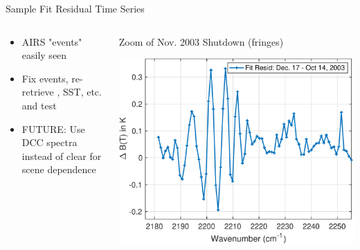 \documentclass[10pt,t]{beamer}
\begin{document}
\begin{frame}[label={sec:org71c5196}]{Sample Fit Residual Time Series}
\vspace{-0.2in}

\begin{columns}
\begin{column}{0.5\columnwidth}
\begin{block}{}
\begin{footnotesize}
\begin{itemize}
\item AIRS "events" easily seen
\item Fix events, re-retrieve \cd, SST, etc. and test
\item FUTURE: Use DCC spectra instead of clear for scene dependence
\end{itemize}
\end{footnotesize}
\end{block}
\end{column}

\begin{column}{0.5\columnwidth}
\begin{block}{\footnotesize Zoom of Nov. 2003 Shutdown (fringes)}
\vspace{-0.1in}
\begin{center}
\includegraphics[width=0.85\linewidth]{./Figs/Pdf/resid_spectrum_dec17_minus_oct14_2003_swzoom.pdf}
\end{center}
\end{block}
\end{column}
\end{columns}
\end{frame}
\end{document}
